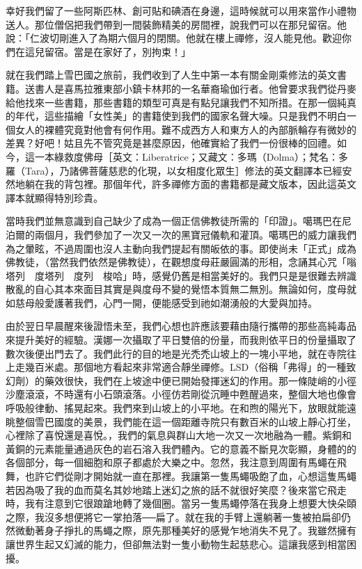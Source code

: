 幸好我們留了一些阿斯匹林、創可貼和碘酒在身邊，這時候就可以用來當作小禮物送人。那位僧侶把我們帶到一間裝飾精美的房間裡，說我們可以在那兒留宿。他說：「仁波切剛進入了為期六個月的閉關。他就在樓上禪修，沒人能見他。歡迎你們在這兒留宿。當是在家好了，別拘束！」

就在我們踏上雪巴國之旅前，我們收到了人生中第一本有關金剛乘修法的英文書籍。送書人是喜馬拉雅東部小鎮卡林邦的一名華裔瑜伽行者。他曾要求我們從丹麥給他找來一些書籍，那些書籍的類型可真是有點兒讓我們不知所措。在那一個純真的年代，這些描繪「女性美」的書籍使到我們的國家名聲大噪。只是我們不明白一個女人的裸體究竟對他會有何作用。難不成西方人和東方人的內部脈輪存有微妙的差異？好吧！姑且先不管究竟是甚麼原因，他確實給了我們一份很棒的回禮。如今，這一本綠救度佛母［英文：Liberatrice；又藏文：多瑪（Dolma）；梵名：多羅（Tara），乃諸佛菩薩慈悲的化現，以女相度化眾生］修法的英文翻譯本已經安然地躺在我的背包裡。那個年代，許多禪修方面的書籍都是藏文版本，因此這英文譯本就顯得特別珍貴。

當時我們並無意識到自己缺少了成為一個正信佛教徒所需的「印證」。噶瑪巴在尼泊爾的兩個月，我們參加了一次又一次的黑寶冠儀軌和灌頂。噶瑪巴的威力讓我們為之暈眩，不過周圍也沒人主動向我們提起有關皈依的事。即使尚未「正式」成為佛教徒，（當然我們依然是佛教徒），在觀想度母莊嚴圓滿的形相，念誦其心咒「嗡　塔列　度塔列　度列　梭哈」時，感覺仍舊是相當美好的。我們只是是很難去辨識散亂的自心其本來面目其實是與度母不變的覺悟本質無二無別。無論如何，度母就如慈母般愛護著我們，心門一開，便能感受到祂如潮湧般的大愛與加持。

由於翌日早晨醒來後證悟未至，我們心想也許應該要藉由隨行攜帶的那些高純毒品來提升美好的經驗。漢娜一次攝取了平日雙倍的份量，而我則依平日的份量攝取了數次後便出門去了。我們此行的目的地是光禿禿山坡上的一塊小平地，就在寺院往上走幾百米處。那個地方看起來非常適合靜坐禪修。LSD（俗稱「弗得」的一種致幻劑）的藥效很快，我們在上坡途中便已開始發揮迷幻的作用。那一條陡峭的小徑沙塵滾滾，不時還有小石頭滾落。小徑仿若剛從沉睡中甦醒過來，整個大地也像會呼吸般律動、搖晃起來。我們來到山坡上的小平地。在和煦的陽光下，放眼就能遠眺整個雪巴國度的美景，我們能在這一個距離寺院只有數百米的山坡上靜心打坐，心裡除了喜悅還是喜悅。，我們的氣息與群山大地一次又一次地融為一體。紫銅和黃銅的元素能量通過灰色的岩石溶入我們體內。它的意義不斷見次彰顯，身體的的各個部分，每一個細胞和原子都處於大樂之中。忽然，我注意到周圍有馬蠅在飛舞，也許它們從剛才開始就一直在那裡。我讓第一隻馬蠅吸飽了血，心想這隻馬蠅若因為吸了我的血而莫名其妙地踏上迷幻之旅的話不就很好笑麼？後來當它飛走時，我有注意到它很踉蹌地轉了幾個圈。當另一隻馬蠅停落在我身上想要大快朵頤之際，我沒多想便將它一掌拍落──扁了。就在我的手臂上還躺著一隻被拍扁卻仍然微動著身子掙扎的馬蠅之際，原先那種美好的感覺乍地消失不見了。我雖然擁有讓世界生起又幻滅的能力，但卻無法對一隻小動物生起慈悲心。這讓我感到相當困擾。

